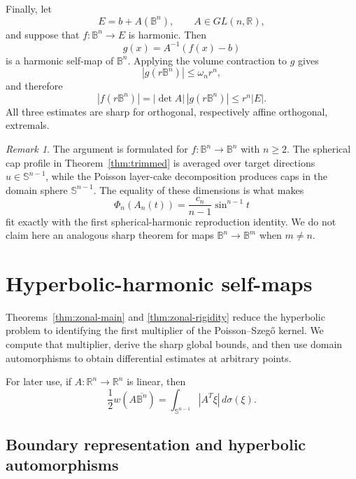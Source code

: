\documentclass[11pt,reqno]{amsart}
\theoremstyle{remark}
\newtheorem{remark}[theorem]{Remark}
\begin{document}
Finally, let
\[
E=b+A(\mathbb B^n),
\qquad A\in GL(n,\mathbb R),
\]
and suppose that $f:\mathbb B^n\to E$ is harmonic.  Then
\[
g(x)=A^{-1}(f(x)-b)
\]
is a harmonic self-map of $\mathbb B^n$.  Applying the volume contraction
to $g$ gives
\[
|g(r\mathbb B^n)|\le\omega_n r^n,
\]
and therefore
\[
|f(r\mathbb B^n)|
=
|\det A|\,|g(r\mathbb B^n)|
\le
r^n|E|.
\]
All three estimates are sharp for orthogonal, respectively affine
orthogonal, extremals.
\begin{remark}
The argument is formulated for
$f:\mathbb B^n\to\mathbb B^n$ with $n\ge2$.  The spherical cap profile in
Theorem~\ref{thm:trimmed} is averaged over target directions
$u\in\mathbb S^{n-1}$, while the Poisson layer-cake decomposition produces
caps in the domain sphere $\mathbb S^{n-1}$.  The equality of these
dimensions is what makes
\[
 \Phi_n(A_n(t))
 =
 \frac{c_n}{n-1}\sin^{n-1}t
\]
fit exactly with the first spherical-harmonic reproduction identity.  We do
not claim here an analogous sharp theorem for maps
$\mathbb B^n\to\mathbb B^m$ when $m\ne n$.
\end{remark}


\section{Hyperbolic-harmonic self-maps}\label{hyp:sec:hyperbolic}

Theorems~\ref{thm:zonal-main} and \ref{thm:zonal-rigidity} reduce the
hyperbolic problem to identifying the first multiplier of the
Poisson--Szeg\H{o} kernel.  We compute that multiplier, derive the sharp
global bounds, and then use domain automorphisms to obtain differential
estimates at arbitrary points.

For later use, if $A:\mathbb R^n\to\mathbb R^n$ is linear, then
\begin{equation}\label{eq:hyp-ellipsoid-width}
 \frac12 w(A\overline{\mathbb B^n})
 =\int_{\mathbb S^{n-1}}|A^T\xi|\,d\sigma(\xi).
\end{equation}

\subsection{Boundary representation and hyperbolic automorphisms}
\end{document}
